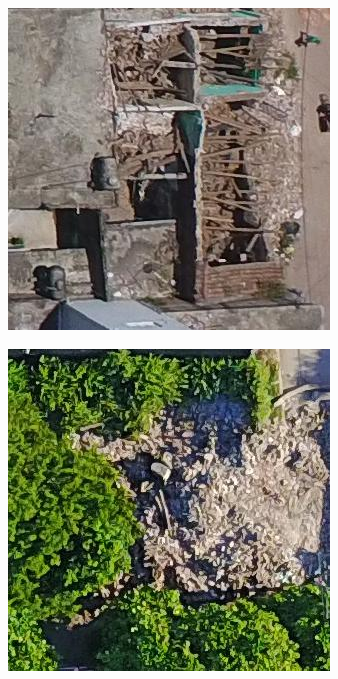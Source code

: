 \begin{figure}[!h]
\begin{subfigure}{.24\textwidth}
    \end{subfigure}
    \begin{subfigure}{.24\textwidth}
        \includegraphics[width=\textwidth]{images/damaged3.jpg}
    \end{subfigure}
    \begin{subfigure}{.24\textwidth}
        \includegraphics[width=\textwidth]{images/damaged4.jpg}

\end{subfigure}
\end{figure}
